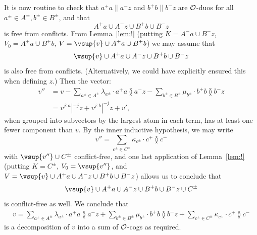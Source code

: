 \begin{claimproof}
It is now routine to check that $a^+ a \parallel a^- z$ and $b^+ b \parallel b^- z$ are $\cal O$-duos for all $a^\pm \in A^\pm, b^\pm \in B^\pm$,
and that 
\[
    A^+ a \cup A^- z \cup B^+ b \cup B^- z
\]
is free from conflicts.
From Lemma~\ref{lem:!} (putting $K = A^- a \cup B^- z$, $V_0 = A^\pm a \cup B^\pm b$, $V = \vsup{v} \cup A^\pm a \cup B^\pm b$) we may assume that 
\[
\vsup{v} \cup A^+ a \cup A^- z \cup B^+ b \cup B^- z
\] 
is also free from conflicts.
(Alternatively, we could have explicitly ensured this when defining $z$.)
Then the vector:
\begin{align*}
    v'' &= v
    - \sum_{a^\pm\in A^\pm} \lambda_{a^\pm} \cdot a^+ a \between a^- z 
    - \sum_{b^\pm\in B^\pm} \mu_{b^\pm} \cdot b^+ b \between b^- z  \\
    &= v^{j:a}|^{-j} z + v^{j:b}|^{-j} z + v',
\end{align*}
when grouped into subvectors by the largest atom in each term, has at least one fewer component than $v$.
By the inner inductive hypothesis, we may write
\[
    v'' = \sum_{c^\pm\in C^\pm} \kappa_{c^\pm} \cdot c^+ \between c^-
\]
with $\vsup{v''} \cup C^\pm$ conflict-free, and one
last application of Lemma~\ref{lem:!} (putting $K = C^\pm$, $V_0 = \vsup{v''}$, and $V = \vsup{v} \cup A^+ a \cup A^- z \cup B^+ b \cup B^- z$) allows us to conclude that
\[
    \vsup{v} \cup A^+ a \cup A^- z \cup B^+ b \cup B^- z \cup C^\pm
\]
is conflict-free as well.
We conclude that
\begin{align*}
    v = 
      \sum_{a^\pm\in A^\pm} \lambda_{a^\pm} \cdot a^+ a \between a^- z 
    + \sum_{b^\pm\in B^\pm} \mu_{b^\pm} \cdot b^+ b \between b^- z 
    + \sum_{c^\pm\in C^\pm} \kappa_{c^\pm} \cdot c^+ \between c^-
\end{align*}
is a decomposition of $v$ into a sum of $\cal O$-cogs as required.
\end{claimproof}

